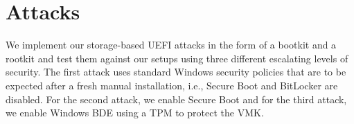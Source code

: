 
\chapter{Attacks}
\label{sec:attacks}

We implement our storage-based \ac{UEFI} attacks in the form of a bootkit and a rootkit and test them against our setups using three different escalating levels of security.
The first attack uses standard Windows security policies that are to be expected after a fresh manual installation, i.e., Secure Boot and BitLocker are disabled.
For the second attack, we enable Secure Boot and for the third attack, we enable Windows \ac{BDE} using a \ac{TPM} to protect the \ac{VMK}.




